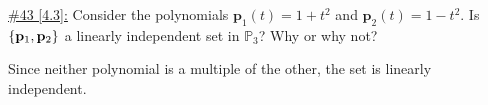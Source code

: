 \documentclass{exam}
\begin{document}
\underline{\#43 [4.3]:} Consider the polynomials $\mathbf{p}_1(t) = 1+t^2$ and $\mathbf{p}_2(t) = 1-t^2$. Is $\left\{\mathbf{p}_1, \mathbf{p}_2 \right\}$ a linearly independent set in $\mathbb{P}_3$? Why or why not?
\begin{solution}
    Since neither polynomial is a multiple of the other, the set is linearly independent.
\end{solution}

\end{document}
